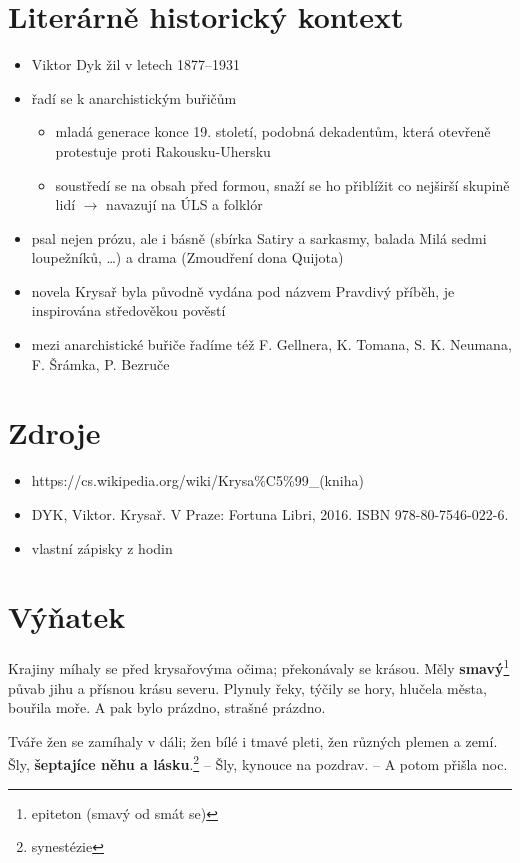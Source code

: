 \documentclass[10pt,a4paper]{article}
\newcommand{\ra}{$\rightarrow$ }
\begin{document}
\section*{Literárně historický kontext}
\begin{itemize}
\item Viktor Dyk žil v letech 1877--1931
\item řadí se k anarchistickým buřičům
	\begin{itemize}
	\item mladá generace konce 19. století, podobná dekadentům, která otevřeně protestuje proti Rakousku-Uhersku
	\item soustředí se na obsah před formou, snaží se ho přiblížit co nejširší skupině lidí \ra navazují na ÚLS  a folklór
	\end{itemize}
\item psal nejen prózu, ale i básně (sbírka Satiry a sarkasmy, balada Milá sedmi loupežníků, \ldots) a drama (Zmoudření dona Quijota)
\item novela Krysař byla původně vydána pod názvem Pravdivý příběh, je inspirována středověkou pověstí
\item mezi anarchistické buřiče řadíme též F. Gellnera, K. Tomana, S. K. Neumana, F. Šrámka, P. Bezruče
\end{itemize}
\section*{Zdroje}
\begin{itemize}
\item https://cs.wikipedia.org/wiki/Krysa\%C5\%99\_(kniha)
\item DYK, Viktor. Krysař. V Praze: Fortuna Libri, 2016. ISBN 978-80-7546-022-6.
\item vlastní zápisky z hodin
\end{itemize}

\newpage
\section*{Výňatek}
Krajiny míhaly se před krysařovýma očima; překonávaly se krásou. Měly \textbf{smavý}\footnote{epiteton (smavý od smát se)} půvab jihu a přísnou krásu severu. Plynuly řeky, týčily se hory, hlučela města, bouřila moře. A pak bylo prázdno, strašné prázdno.

Tváře žen se zamíhaly v dáli; žen bílé i tmavé pleti, žen různých plemen a zemí. Šly, \textbf{šeptajíce něhu a lásku}.\footnote{synestézie} – Šly, kynouce na pozdrav. – A potom přišla noc.
\end{document}
